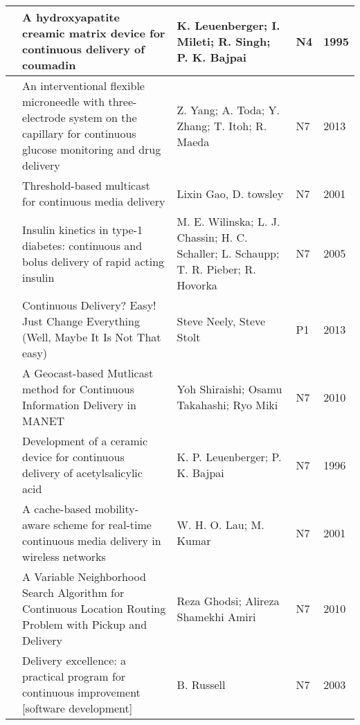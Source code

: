 \begin{landscape}
\begin{longtable}{|l|L{10cm}|L{10cm}|l|l|}
     & A hydroxyapatite creamic matrix device for continuous delivery of coumadin & K. Leuenberger; I. Mileti; R. Singh; P. K. Bajpai & N4 & 1995 \\ \hline
    
     & An interventional flexible microneedle with three-electrode system on the capillary for continuous glucose monitoring and drug delivery & Z. Yang; A. Toda; Y. Zhang; T. Itoh; R. Maeda & N7 & 2013 \\ \hline
    
     & Threshold-based multicast for continuous media delivery & Lixin Gao, D. towsley & N7 & 2001 \\ \hline
    
     & Insulin kinetics in type-1 diabetes: continuous and bolus delivery of rapid acting insulin & M. E. Wilinska; L. J. Chassin; H. C. Schaller; L. Schaupp; T. R. Pieber; R. Hovorka & N7 & 2005 \\ \hline
    
     & Continuous Delivery? Easy! Just Change Everything (Well, Maybe It Is Not That easy) & Steve Neely, Steve Stolt & P1 & 2013\\ \hline
    
     & A Geocast-based Mutlicast method for Continuous Information Delivery in MANET & Yoh Shiraishi; Osamu Takahashi; Ryo Miki & N7 & 2010 \\ \hline
    
     & Development of a ceramic device for continuous delivery of acetylsalicylic acid & K. P. Leuenberger; P. K. Bajpai & N7 & 1996 \\ \hline
    
     & A cache-based mobility-aware scheme for real-time continuous media delivery in wireless networks & W. H. O. Lau; M. Kumar & N7 & 2001 \\ \hline
    
     & A Variable Neighborhood Search Algorithm for Continuous Location Routing Problem with Pickup and Delivery & Reza Ghodsi; Alireza Shamekhi Amiri & N7 & 2010 \\ \hline
    
     & Delivery excellence: a practical program for continuous improvement [software development] & B. Russell & N7 & 2003 \\ \hline
    

\end{longtable}
\end{landscape}
